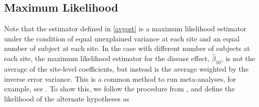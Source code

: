 \subsection{Maximum Likelihood}
Note that the estimator defined in \ref{avgest} is a maximum likelihood estimator under the condition of equal unexplained variance at each site and an equal number of subject at each site. In the case with different number of subjects at each site, the maximum likelihood estimator for the disease effect, $\hat{\beta}_{10}$, is not the average of the site-level coefficients, but instead is the average weighted by the inverse error variance. This is a common method to run meta-analyses, for example, see \cite{enigmarandom,thompson2014enigma}. To show this, we follow the procedure from \cite{enigmarandom}, and define the likelihood of the alternate hypotheses as